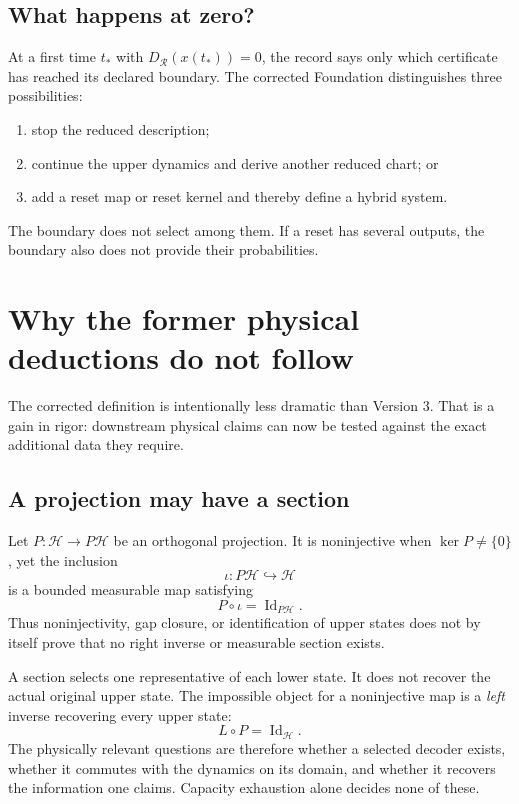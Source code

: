 \documentclass[11pt]{article}
\theoremstyle{definition}
\theoremstyle{remark}
\newcommand{\cH}{\mathcal H}
\newcommand{\cR}{\mathcal R}
\newcommand{\Id}{\operatorname{Id}}
\begin{document}
\subsection{What happens at zero?}

At a first time \(t_\ast\) with \(D_{\cR}(x(t_\ast))=0\), the record says
only which certificate has reached its declared boundary.  The corrected
Foundation distinguishes three possibilities:
\begin{enumerate}[leftmargin=2em]
\item stop the reduced description;
\item continue the upper dynamics and derive another reduced chart; or
\item add a reset map or reset kernel and thereby define a hybrid system.
\end{enumerate}
The boundary does not select among them.  If a reset has several outputs,
the boundary also does not provide their probabilities.

\section{Why the former physical deductions do not follow}
\label{sec:nodeductions}

The corrected definition is intentionally less dramatic than Version 3.
That is a gain in rigor: downstream physical claims can now be tested
against the exact additional data they require.

\subsection{A projection may have a section}

Let \(P:\cH\to P\cH\) be an orthogonal projection.  It is noninjective when
\(\ker P\ne\{0\}\), yet the inclusion
\[
 \iota:P\cH\hookrightarrow\cH
\]
is a bounded measurable map satisfying
\[
 P\circ\iota=\Id_{P\cH}.
\]
Thus noninjectivity, gap closure, or identification of upper states does
not by itself prove that no right inverse or measurable section exists.

A section selects one representative of each lower state.  It does not
recover the actual original upper state.  The impossible object for a
noninjective map is a \emph{left} inverse recovering every upper state:
\[
 L\circ P=\Id_{\cH}.
\]
The physically relevant questions are therefore whether a selected decoder
exists, whether it commutes with the dynamics on its domain, and whether it
recovers the information one claims.  Capacity exhaustion alone decides
none of these.
\end{document}
